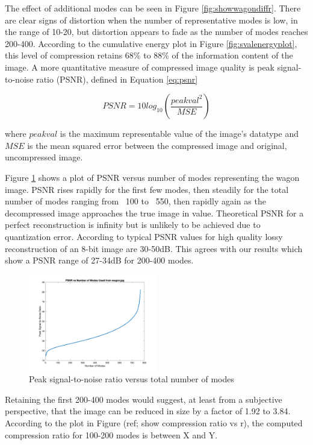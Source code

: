 \documentclass[conference]{IEEEtran}
\begin{document}
    The effect of additional modes can be seen in Figure \ref{fig:showwagondiffr}. There are clear signs of distortion when the number of representative modes is low, in the range of 10-20, but distortion appears to fade as the number of modes reaches 200-400. According to the cumulative energy plot in Figure \ref{fig:svalenergyplot}, this level of compression retains 68\% to 88\% of the information content of the image. A more quantitative measure of compressed image quality is peak signal-to-noise ratio (PSNR), defined in Equation \ref{eq:psnr}

    \begin{equation}
    		PSNR = 10log_{10}(\frac{peakval^2}{MSE})
    \label{eq:psnr}
    \end{equation}

    where $peakval$ is the maximum representable value of the image's datatype and $MSE$ is the mean squared error between the compressed image and original, uncompressed image.

    Figure \ref{fig:psnrvsr_wagon} shows a plot of PSNR versus number of modes representing the wagon image. PSNR rises rapidly for the first few modes, then steadily for the total number of modes ranging from ~100 to ~550, then rapidly again as the decompressed image approaches the true image in value. Theoretical PSNR for a perfect reconstruction is infinity but is unlikely to be achieved due to quantization error. According to \cite{psnr_quality} typical PSNR values for high quality lossy reconstruction of an 8-bit image are 30-50dB. This agrees with our results which show a PSNR range of 27-34dB for 200-400 modes.

    \begin{figure}[t]
    \includegraphics[width=0.5\textwidth]{snrvsr_wagon_rgb}
    \caption{Peak signal-to-noise ratio versus total number of modes}
    \label{fig:psnrvsr_wagon}
    \end{figure}
    
    Retaining the first 200-400 modes would suggest, at least from a subjective perspective, that the image can be reduced in size by a factor of 1.92 to 3.84. According to the plot in Figure (ref; show compression ratio vs r), the computed compression ratio for 100-200 modes is between X and Y.
\end{document}
